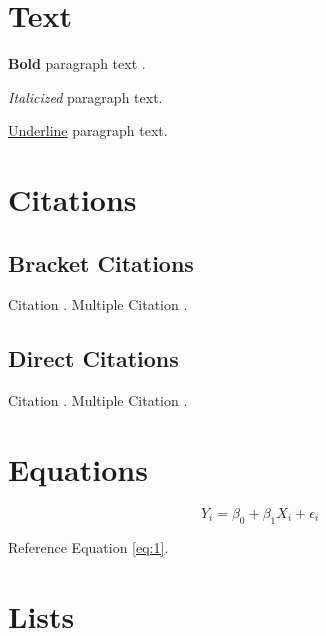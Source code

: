 



\section{Text} \label{section}

\textbf{Bold} paragraph text .

\textit{Italicized} paragraph text.

\underline{Underline} paragraph text.




\section{Citations} \label{citations}

\subsection{Bracket Citations} \label{bracket-citations}

Citation \citep{lastnamep:yearp}. Multiple Citation \citep{lastnamep:yearp,lastnamee:yeare,lastnamea:yeara}.

\subsection{Direct Citations} \label{direct-citations}

Citation \citet{lastnamep:yearp}. Multiple Citation \citet{lastnamep:yearp,lastnamee:yeare,lastnamea:yeara}.




\section{Equations} \label{equations}

\begin{equation}
\label{eq:1}
	Y_i = \beta_0 + \beta_1 X_i + \epsilon_i
\end{equation}

Reference Equation \ref{eq:1}.




\section{Lists} \label{lists}

